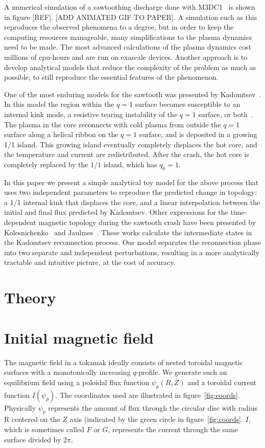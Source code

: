 \documentclass[%
superscriptaddress,
amsmath,amssymb,
aps,
pre,
floatfix,
]{revtex4-2}
\begin{document}
A numerical simulation of a sawtoothing discharge done with M3DC1~\cite{jardin2012multiple} is shown in figure [REF]. [ADD ANIMATED GIF TO PAPER]. 
A simulation such as this reproduces the observed phenomena to a degree, but in order to keep the computing resources manageable, many simplifications to the plasma dynamics need to be made. 
The most advanced calculations of the plasma dynamics cost millions of cpu-hours and are run on exascale devices. 
Another approach is to develop analytical models that reduce the complexity of the problem as much as possible, to still reproduce the essential features of the phenomenon. 

One of the most enduring models for the sawtooth was presented by Kadomtsev~\cite{kadomtsev1975disruptive}.
In this model the region within the $q=1$ surface becomes susceptible to an internal kink mode, a resistive tearing instability of the $q=1$ surface, or both~\cite{coppi1976resistive}.
The plasma in the core reconnects with cold plasma from outside the $q=1$ surface along a helical ribbon on the $q=1$ surface, and is deposited in a growing 1/1 island.
This growing island eventually completely displaces the hot core, and the temperature and current are redistributed.
After the crash, the hot core is completely replaced by the $1/1$ island, which has $q_0=1$.

In this paper we present a simple analytical toy model for the above process that uses two independent parameters to reproduce the predicted change in topology: a 1/1 internal kink that displaces the core, and a linear interpolation between the initial and final flux predicted by Kadomtsev.
Other expressions for the time-dependent magnetic topology during the sawtooth crash have been presented by Kolesnichenko~\cite{kolesnichenko1996theory} and Jaulmes~\cite{jaulmes2014redistribution}.
These works calculate the intermediate states in the Kadomtsev reconnection process. 
Our model separates the reconnection phase into two separate and independent perturbations, resulting in a more analytically tractable and intuitive picture, at the cost of accuracy.



\section{Theory}

\section*{Initial magnetic field}
The magnetic field in a tokamak ideally consists of nested toroidal magnetic surfaces with a monotonically increasing $q$-profile.
We generate such an equilibrium field using a poloidal flux function $\psi_p(R, Z)$ and a toroidal current function $I(\psi_p)$.
The coordinates used are illustrated in figure~\ref{fig:coords}.
Physically $\psi_p$ represents the amount of flux through the circular disc with radius R centered on the $Z$ axis (indicated by the green circle in figure~\ref{fig:coords}.
$I$, which is sometimes called $F$ or $G$, represents the current through the same surface divided by 2$\pi$.
\end{document}
